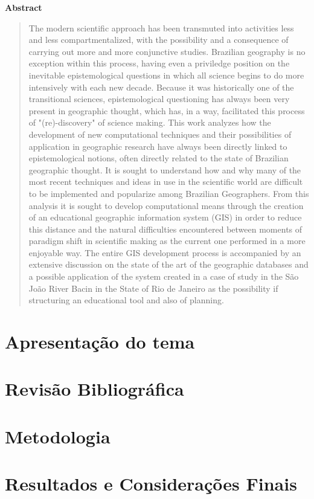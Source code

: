 \documentclass[12pt,a4paper,openany]{book} %
\begin{document}
	\newpage
	\begin{center}
		\textbf{\LARGE Abstract}
	\end{center}
	\begin{quote}
		The modern scientific approach has been transmuted into activities less and less compartmentalized, with the possibility and a consequence of carrying out more and more conjunctive studies. Brazilian geography is no exception within this process, having even a priviledge position on the inevitable epistemological questions in which all science begins to do more intensively with each new decade. Because it was historically one of the transitional sciences, epistemological questioning has always been very present in geographic thought, which has, in a way, facilitated this process of "(re)-discovery" of science making.
		This work analyzes how the development of new computational techniques and their possibilities of application in geographic research have always been directly linked to epistemological notions, often directly related to the state of Brazilian geographic thought. It is sought to understand how and why many of the most recent techniques and ideas in use in the scientific world are difficult to be implemented and popularize among Brazilian Geographers.
		From this analysis it is sought to develop computational means through the creation of an educational geographic information system (GIS) in order to reduce this distance and the natural difficulties encountered between moments of paradigm shift in scientific making as the current one performed in a more enjoyable way.
		The entire GIS development process is accompanied by an extensive discussion on the state of the art of the geographic databases and a possible application of the system created in a case of study in the São João River Bacin in the State of Rio de Janeiro as the possibility if structuring an educational tool and also of planning.
	\end{quote}

	\part{Apresentação do tema}
	
	
	
	\part{Revisão Bibliográfica}
	
	
	\part{Metodologia}
	
	
	\part{Resultados e Considerações Finais}
	
	
	
	
	
\end{document}
